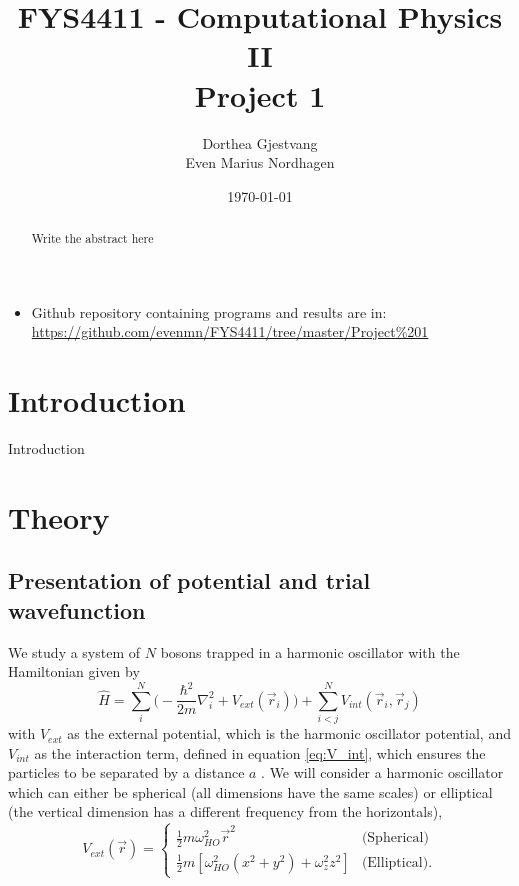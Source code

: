 \documentclass[norsk,a4paper,12pt]{article}
\title{FYS4411 - Computational Physics II\\\vspace{2mm} \Large{Project 1}}
\author{\large Dorthea Gjestvang\\ Even Marius Nordhagen}
\date\today
\begin{document}
\maketitle
\begin{abstract}
Write the abstract here
\par 

\end{abstract}


\begin{itemize}
\item Github repository containing programs and results are in: \url{https://github.com/evenmn/FYS4411/tree/master/Project%201}
\end{itemize}


\section{Introduction}
Introduction

\section{Theory}

\subsection{Presentation of potential and trial wavefunction} 

We study a system of $N$ bosons trapped in a harmonic oscillator with the Hamiltonian given by 
\begin{equation}
\hat{H}=\sum_i^N\bigg(-\frac{\hbar^2}{2m}\nabla_i^2+V_{ext}(\vec{r}_i)\bigg)+\sum_{i<j}^NV_{int}(\vec{r}_i,\vec{r}_j)
\label{eq:Hamilton}
\end{equation}
with $V_{ext}$ as the external potential, which is the harmonic oscillator potential,
and $V_{int}$ as the interaction term, defined in equation \ref{eq:V_int}, which ensures the particles to be separated by a distance $a$ . We will consider a harmonic oscillator which can either be spherical (all dimensions have the same scales) or elliptical (the vertical dimension has a different frequency from the horizontals),
\begin{equation}
\label{eq:V_ext}
V_{ext}(\vec{r})=
\begin{cases} 
   \frac{1}{2}m\omega_{HO}^2\vec{r}^2 & \text{(Spherical)} \\
   \frac{1}{2}m[\omega_{HO}^2(x^2 + y^2) + \omega_z^2z^2] & \text{(Elliptical)}.
\end{cases}
\end{equation}
\end{document}

